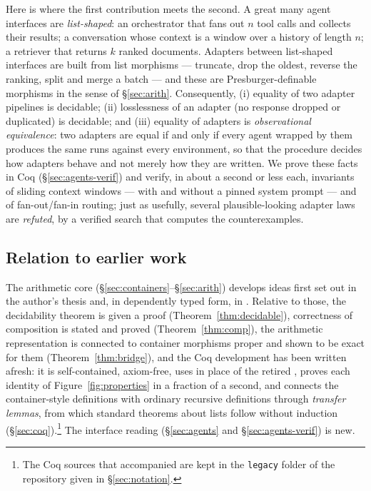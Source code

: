 \documentclass{fundam}
\begin{document}
Here is where the first contribution meets the second.  A great many agent interfaces are
\emph{list-shaped}: an orchestrator that fans out $n$ tool calls and collects their
results; a conversation whose context is a window over a history of length $n$; a
retriever that returns $k$ ranked documents.  Adapters between list-shaped interfaces
are built from list morphisms --- truncate, drop the oldest, reverse the ranking, split
and merge a batch --- and these are Presburger-definable morphisms in the sense of
\S\ref{sec:arith}.  Consequently, (i) equality of two adapter pipelines is decidable;
(ii) losslessness of an adapter (no response dropped or duplicated) is decidable; and
(iii) equality of adapters is \emph{observational equivalence}: two adapters are equal if
and only if every agent wrapped by them produces the same runs against every
environment, so that the procedure decides how adapters behave and not merely how they
are written.  We prove these facts in Coq (\S\ref{sec:agents-verif}) and verify, in about
a second or less each, invariants of sliding context windows --- with and without a
pinned system prompt --- and of fan-out/fan-in routing; just as usefully, several
plausible-looking adapter laws are \emph{refuted}, by a verified search that computes the
counterexamples.

\subsection{Relation to earlier work}

The arithmetic core (\S\ref{sec:containers}--\S\ref{sec:arith}) develops ideas first set
out in the author's thesis \cite{Prince10} and, in dependently typed form, in
\cite{PrinceGhaniMcBride08}.  Relative to those, the decidability theorem is given a proof
(Theorem~\ref{thm:decidable}), correctness of composition is stated and proved
(Theorem~\ref{thm:comp}), the arithmetic representation is connected to container
morphisms proper and shown to be exact for them (Theorem~\ref{thm:bridge}), and the Coq
development has been written afresh: it is self-contained, axiom-free, uses  in place of the retired
, proves each identity of Figure~\ref{fig:properties} in a fraction of a
second, and connects the container-style definitions with ordinary recursive definitions
through \emph{transfer lemmas}, from which standard theorems about lists follow without
induction (\S\ref{sec:coq}).\footnote{The Coq sources that accompanied \cite{Prince10} are
kept in the \texttt{legacy} folder of the repository given in \S\ref{sec:notation}.}  The
interface reading (\S\ref{sec:agents} and \S\ref{sec:agents-verif}) is new.
\end{document}
